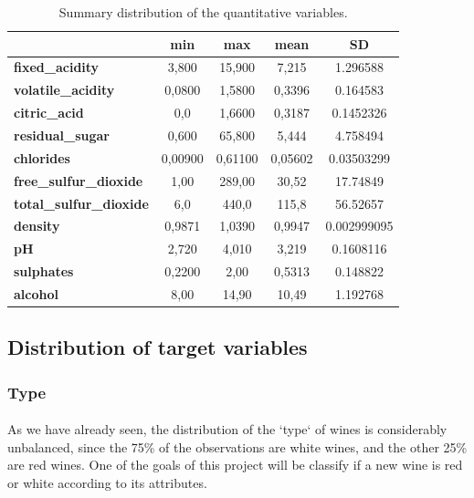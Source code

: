 \documentclass[10pt]{article}
\begin{document}
\begin{table}[h]
	\centering
	\begin{tabular}{|l|c|c|c|c|}
		\hline
		& \textbf{min} & \textbf{max} & \textbf{mean} & \textbf{SD} \\ \hline
		\textbf{fixed\_acidity} & 3,800 & 15,900 & 7,215 & 1.296588 \\ \hline
		\textbf{volatile\_acidity} & 0,0800 & 1,5800 & 0,3396 & 0.164583 \\ \hline
		\textbf{citric\_acid} & 0,0 & 1,6600 & 0,3187 & 0.1452326 \\ \hline
		\textbf{residual\_sugar} & 0,600 & 65,800 & 5,444 & 4.758494 \\ \hline
		\textbf{chlorides} & 0,00900 & 0,61100 & 0,05602 & 0.03503299 \\ \hline
		\textbf{free\_sulfur\_dioxide} & 1,00 & 289,00 & 30,52 & 17.74849 \\ \hline
		\textbf{total\_sulfur\_dioxide} & 6,0 & 440,0 & 115,8 & 56.52657 \\ \hline
		\textbf{density} & 0,9871 & 1,0390 & 0,9947 & 0.002999095 \\ \hline
		\textbf{pH} & 2,720 & 4,010 & 3,219 & 0.1608116 \\ \hline
		\textbf{sulphates} & 0,2200 & 2,00 & 0,5313 & 0.148822 \\ \hline
		\textbf{alcohol} & 8,00 & 14,90 & 10,49 & 1.192768 \\ \hline
	\end{tabular}%
	\caption{Summary distribution of the quantitative variables.}
	\label{table:variables}
\end{table}

\subsection{Distribution of target variables}
\subsubsection{Type}

\paragraph*{}
As we have already seen, the distribution of the `type` of wines is considerably unbalanced, since the 75\% of the observations are white wines, and the other 25\% are red wines. One of the goals of this project will be classify if a new wine is red or white according to its attributes.
\end{document}
